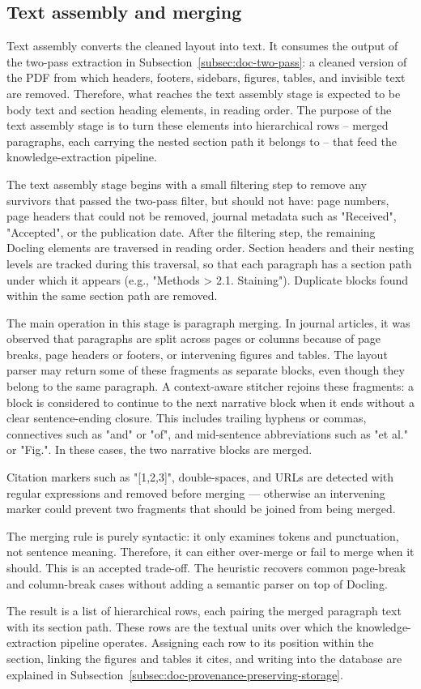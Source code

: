 \subsection{Text assembly and merging}\label{subsec:doc-text-assembly}

Text assembly converts the cleaned layout into text. It consumes the output of the two-pass extraction in Subsection~\ref{subsec:doc-two-pass}: a cleaned version of the PDF from which headers, footers, sidebars, figures, tables, and invisible text are removed. Therefore, what reaches the text assembly stage is expected to be body text and section heading elements, in reading order. The purpose of the text assembly stage is to turn these elements into hierarchical rows -- merged paragraphs, each carrying the nested section path it belongs to -- that feed the knowledge-extraction pipeline. 

The text assembly stage begins with a small filtering step to remove any survivors that passed the two-pass filter, but should not have: page numbers, page headers that could not be removed, journal metadata such as "Received", "Accepted", or the publication date. After the filtering step, the remaining Docling elements are traversed in reading order. Section headers and their nesting levels are tracked during this traversal, so that each paragraph has a section path under which it appears (e.g., "Methods > 2.1. Staining"). Duplicate blocks found within the same section path are removed. 

The main operation in this stage is paragraph merging. In journal articles, it was observed that paragraphs are split across pages or columns because of page breaks, page headers or footers, or intervening figures and tables. The layout parser may return some of these fragments as separate blocks, even though they belong to the same paragraph. A context-aware stitcher rejoins these fragments: a block is considered to continue to the next narrative block when it ends without a clear sentence-ending closure. This includes trailing hyphens or commas, connectives such as "and" or "of", and mid-sentence abbreviations such as "et al." or "Fig.". In these cases, the two narrative blocks are merged. 

Citation markers such as "[1,2,3]", double-spaces, and URLs are detected with regular expressions and removed before merging --- otherwise an intervening marker could prevent two fragments that should be joined from being merged.

The merging rule is purely syntactic: it only examines tokens and punctuation, not sentence meaning. Therefore, it can either over-merge or fail to merge when it should. This is an accepted trade-off. The heuristic recovers common page-break and column-break cases without adding a semantic parser on top of Docling. 

The result is a list of hierarchical rows, each pairing the merged paragraph text with its section path. These rows are the textual units over which the knowledge-extraction pipeline operates. Assigning each row to its position within the section, linking the figures and tables it cites, and writing into the database are explained in Subsection~\ref{subsec:doc-provenance-preserving-storage}. 